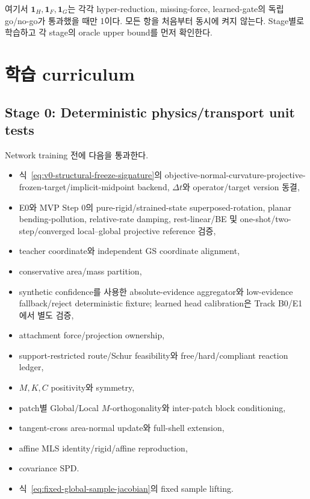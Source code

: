 \documentclass[11pt,a4paper]{article}
\begin{document}
여기서 \(\mathbf 1_H,\mathbf 1_F,\mathbf 1_G\)는 각각
hyper-reduction, missing-force, learned-gate의 독립 go/no-go가 통과했을 때만 1이다.
모든 항을 처음부터 동시에 켜지 않는다.
Stage별로 학습하고 각 stage의 oracle upper bound를 먼저 확인한다.

\section{학습 curriculum}

\subsection{Stage 0: Deterministic physics/transport unit tests}

Network training 전에 다음을 통과한다.

\begin{itemize}[leftmargin=1.5em]
  \item 식~\eqref{eq:v0-structural-freeze-signature}의
  objective-normal-curvature-projective-frozen-target/implicit-midpoint backend,
  \(\Delta t\)와 operator/target version 동결,
  \item E0와 MVP Step 0의 pure-rigid/strained-state superposed-rotation,
  planar bending-pollution, relative-rate damping,
  rest-linear/BE 및 one-shot/two-step/converged local--global projective reference 검증,
  \item teacher coordinate와 independent GS coordinate alignment,
  \item conservative area/mass partition,
  \item synthetic confidence를 사용한 absolute-evidence aggregator와 low-evidence fallback/reject
  deterministic fixture; learned head calibration은 Track B0/E1에서 별도 검증,
  \item attachment force/projection ownership,
  \item support-restricted route/Schur feasibility와 free/hard/compliant reaction ledger,
  \item \(M,K,C\) positivity와 symmetry,
  \item patch별 Global/Local \(M\)-orthogonality와 inter-patch block conditioning,
  \item tangent-cross area-normal update와 full-shell extension,
  \item affine MLS identity/rigid/affine reproduction,
  \item covariance SPD.
  \item 식~\eqref{eq:fixed-global-sample-jacobian}의 fixed sample lifting.
\end{itemize}
\end{document}
